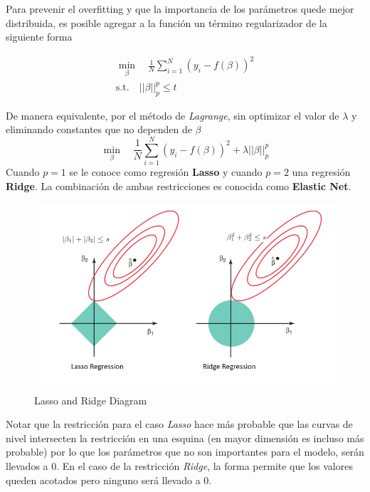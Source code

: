 Para prevenir el overfitting y que la importancia de los parámetros quede mejor distribuida, es posible agregar a la función un término regularizador de la siguiente forma

\begin{equation*}
\begin{aligned}
\min_{\beta} \quad \frac{1}{N}\sum_{i=1}^N(y_i - f(\beta))^2 \\
\textrm{s.t.} \quad ||\beta||^{p}_{p} \leq t
\end{aligned}
\end{equation*}

De manera equivalente, por el método de \textit{Lagrange}, sin optimizar el valor de $\lambda$ y eliminando constantes que no dependen de $\beta$
$$\min_{\beta} \quad \frac{1}{N}\sum_{i=1}^N(y_i - f(\beta))^2 + \lambda ||\beta||^{p}_{p}$$
Cuando $p=1$ se le conoce como regresión \textbf{Lasso} y cuando $p=2$ una regresión \textbf{Ridge}. La combinación de ambas restricciones es conocida como \textbf{Elastic Net}. 

\begin{figure}[H]
    \center
    \includegraphics[scale=0.4]{notebooks/ML/img/lasso_and_ridge_diagram.png}
    \caption{Lasso and Ridge Diagram}
\end{figure}

Notar que la restricción para el caso \textit{Lasso} hace más probable que las curvas de nivel intersecten la restricción en una esquina (en mayor dimensión es incluso más probable) por lo que los parámetros que no son importantes para el modelo, serán llevados a 0. En el caso de la restricción \textit{Ridge}, la forma permite que los valores queden acotados pero ninguno será llevado a 0.

